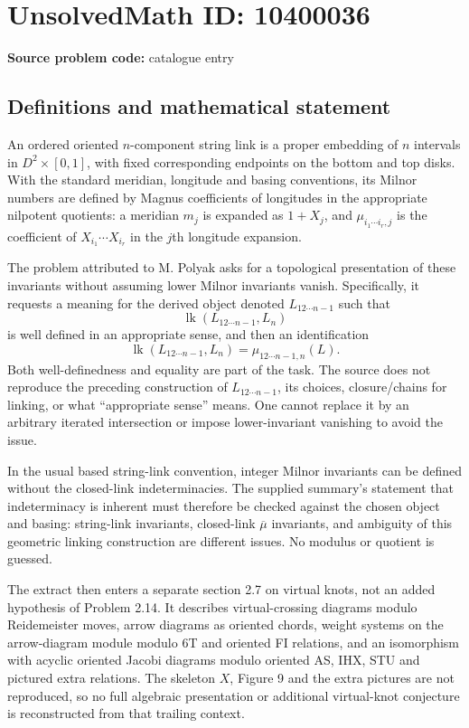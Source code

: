 \documentclass[11pt]{article}
\begin{document}
\section*{UnsolvedMath ID: 10400036}
\textbf{Source problem code:} catalogue entry
\subsection{Definitions and mathematical statement}
An ordered oriented $n$-component string link is a proper embedding of $n$ intervals in $D^2\times[0,1]$, with fixed corresponding endpoints on the bottom and top disks. With the standard meridian, longitude and basing conventions, its Milnor numbers are defined by Magnus coefficients of longitudes in the appropriate nilpotent quotients: a meridian $m_j$ is expanded as $1+X_j$, and $\mu_{i_1\cdots i_r,j}$ is the coefficient of $X_{i_1}\cdots X_{i_r}$ in the $j$th longitude expansion.

The problem attributed to M. Polyak asks for a topological presentation of these invariants without assuming lower Milnor invariants vanish. Specifically, it requests a meaning for the derived object denoted $L_{12\cdots n-1}$ such that
\[
\operatorname{lk}(L_{12\cdots n-1},L_n)
\]
is well defined in an appropriate sense, and then an identification
\[
\operatorname{lk}(L_{12\cdots n-1},L_n)
=\mu_{12\cdots n-1,n}(L).
\]
Both well-definedness and equality are part of the task. The source does not reproduce the preceding construction of $L_{12\cdots n-1}$, its choices, closure/chains for linking, or what ``appropriate sense'' means. One cannot replace it by an arbitrary iterated intersection or impose lower-invariant vanishing to avoid the issue.

In the usual based string-link convention, integer Milnor invariants can be defined without the closed-link indeterminacies. The supplied summary's statement that indeterminacy is inherent must therefore be checked against the chosen object and basing: string-link invariants, closed-link $\overline\mu$ invariants, and ambiguity of this geometric linking construction are different issues. No modulus or quotient is guessed.

The extract then enters a separate section 2.7 on virtual knots, not an added hypothesis of Problem 2.14. It describes virtual-crossing diagrams modulo Reidemeister moves, arrow diagrams as oriented chords, weight systems on the arrow-diagram module modulo 6T and oriented FI relations, and an isomorphism with acyclic oriented Jacobi diagrams modulo oriented AS, IHX, STU and pictured extra relations. The skeleton $X$, Figure 9 and the extra pictures are not reproduced, so no full algebraic presentation or additional virtual-knot conjecture is reconstructed from that trailing context.
\end{document}
